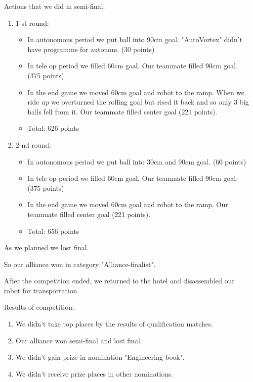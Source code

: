 Actions that we did in semi-final:
\begin{enumerate}
	\item 1-st round:
	\begin{itemize}
		\item In autonomous period we put ball into 90cm goal. "AutoVortex" didn't have programme for autonom. (30 points)
		
		\item In tele op period we filled 60cm goal. Our teammate filled 90cm goal. (375 points)
		
		\item In the end game we moved 60cm goal and robot to the ramp. When we ride up we overturned the rolling goal but rised it back and so only 3 big balls fell from it. Our teammate filled center goal (221 points).
		
		\item Total: 626 points
	\end{itemize}
	\item 2-nd round:
	\begin{itemize}
		\item In autonomous period we put ball into 30cm and 90cm goal. (60 points)
		
		\item In tele op period we filled 60cm goal. Our teammate filled 90cm goal. (375 points)
		
		\item In the end game we moved 60cm goal and robot to the ramp. Our teammate filled center goal (221 points).

		\item Total: 656 points		
	\end{itemize}
\end{enumerate}

As we planned we lost final.

So our alliance won in category "Alliance-finalist".\newline

After the competition ended, we returned to the hotel and disassembled our robot for transportation.

Results of competition:
\begin{enumerate}
	\item We didn't take top places by the results of qualification matches.
	
	\item Our alliance won semi-final and lost final.
	
	\item We didn't gain prize in nomination "Engineering book".
	
	\item We didn't receive prize places in other nominations.
\end{enumerate}

